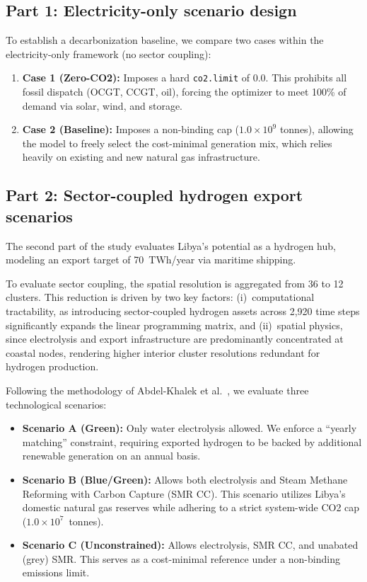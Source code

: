 \documentclass[preprint,12pt]{elsarticle}
\begin{document}
\subsection{Part 1: Electricity-only scenario design}
To establish a decarbonization baseline, we compare two cases within the electricity-only framework (no sector coupling):
\begin{enumerate}
    \item \textbf{Case 1 (Zero-CO2):} Imposes a hard \texttt{co2.limit} of 0.0. This prohibits all fossil dispatch (OCGT, CCGT, oil), forcing the optimizer to meet 100\% of demand via solar, wind, and storage.
    \item \textbf{Case 2 (Baseline):} Imposes a non-binding cap ($1.0 \times 10^9$ tonnes), allowing the model to freely select the cost-minimal generation mix, which relies heavily on existing and new natural gas infrastructure.
\end{enumerate}

\subsection{Part 2: Sector-coupled hydrogen export scenarios}
The second part of the study evaluates Libya's potential as a hydrogen hub, modeling an export target of 70~TWh/year via maritime shipping. 

To evaluate sector coupling, the spatial resolution is aggregated from 36 to 12 clusters. This reduction is driven by two key factors: 
(i)~computational tractability, as introducing sector-coupled hydrogen assets across 2,920 time steps significantly expands the linear programming matrix, and 
(ii)~spatial physics, since electrolysis and export infrastructure are predominantly concentrated at coastal nodes, rendering higher interior cluster resolutions redundant for hydrogen production.

Following the methodology of Abdel-Khalek et al.~\cite{abdelkhalek2025pypsa}, we evaluate three technological scenarios:
\begin{itemize}
    \item \textbf{Scenario A (Green):} Only water electrolysis allowed. We enforce a ``yearly matching'' constraint, requiring exported hydrogen to be backed by additional renewable generation on an annual basis.
    \item \textbf{Scenario B (Blue/Green):} Allows both electrolysis and Steam Methane Reforming with Carbon Capture (SMR CC). This scenario utilizes Libya's domestic natural gas reserves while adhering to a strict system-wide CO2 cap ($1.0 \times 10^7$~tonnes).
    \item \textbf{Scenario C (Unconstrained):} Allows electrolysis, SMR CC, and unabated (grey) SMR. This serves as a cost-minimal reference under a non-binding emissions limit.
\end{itemize}
\end{document}
